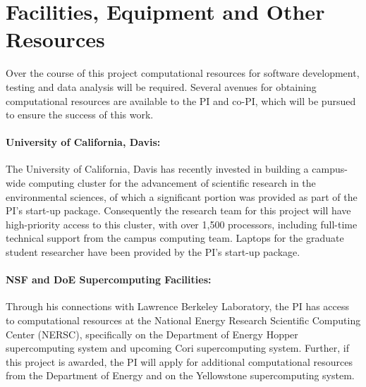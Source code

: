 \documentclass[11pt]{article}
\begin{document}
\appendix

\setcounter{section}{8}

\section{Facilities, Equipment and Other Resources}

Over the course of this project computational resources for software development, testing and data analysis will be required.  Several avenues for obtaining computational resources are available to the PI and co-PI, which will be pursued to ensure the success of this work.

\paragraph{University of California, Davis:} The University of California, Davis has recently invested in building a campus-wide computing cluster for the advancement of scientific research in the environmental sciences, of which a significant portion was provided as part of the PI's start-up package.  Consequently the research team for this project will have high-priority access to this cluster, with over 1,500 processors, including full-time technical support from the campus computing team.  Laptops for the  graduate student researcher have been provided by the PI's start-up package.

\paragraph{NSF and DoE Supercomputing Facilities:}  Through his connections with Lawrence Berkeley Laboratory, the PI has access to computational resources at the National Energy Research Scientific Computing Center (NERSC), specifically on the Department of Energy Hopper supercomputing system and upcoming Cori supercomputing system.  Further, if this project is awarded, the PI will apply for additional computational resources from the Department of Energy and on the Yellowstone supercomputing system.
\end{document}
